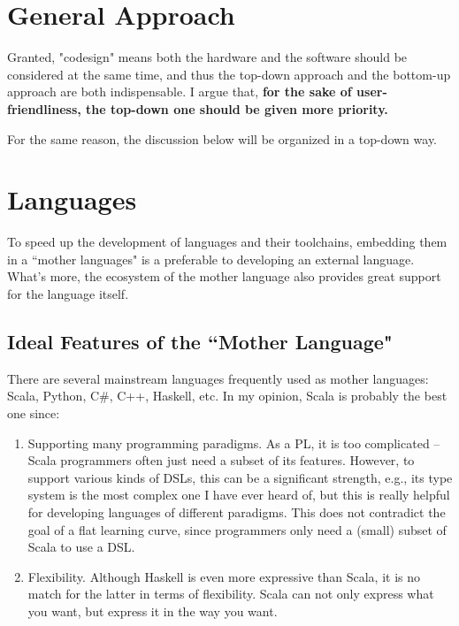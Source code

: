 \documentclass[11pt]{article}
\begin{document}
\section{General Approach}
Granted, "codesign" means both the hardware and the software should be considered at the same time, and thus the top-down approach and the bottom-up approach are both indispensable.
I argue that, \textbf{for the sake of user-friendliness, the top-down one should be given more priority.}

For the same reason, the discussion below will be organized in a top-down way.

\section{Languages}
To speed up the development of languages and their toolchains, embedding them in a ``mother languages" is a preferable to developing an external language.
What's more, the ecosystem of the mother language also provides great support for the language itself.

\subsection{Ideal Features of the ``Mother Language"}
There are several mainstream languages frequently used as mother languages: Scala, Python, C\#, C++, Haskell, etc.
In my opinion, Scala is probably the best one since:
\begin{enumerate}
    \item Supporting many programming paradigms.
    As a PL, it is too complicated -- Scala programmers often just need a subset of its features.
    However, to support various kinds of DSLs, this can be a significant strength, e.g., its type system is the most complex one I have ever heard of, but this is really helpful for developing languages of different paradigms.
    This does not contradict the goal of a flat learning curve, since programmers only need a (small) subset of Scala to use a DSL.
    \item Flexibility.
    Although Haskell is even more expressive than Scala, it is no match for the latter in terms of flexibility.
    Scala can not only express what you want, but express it in the way you want.
\end{enumerate}
\end{document}
